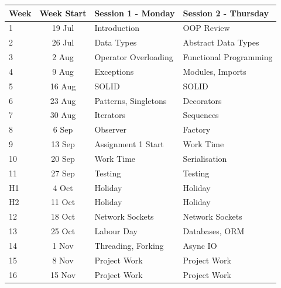 \documentclass{article}
\begin{document}
\renewcommand{\arraystretch}{1.5}
\begin{tabular}{|l|c|l|l|}
\hline
 Week     & Week Start & Session 1 - Monday                 & Session 2 - Thursday    \\ \hline
 1        & 19 Jul     & Introduction                       & OOP Review              \\ \hline
 2        & 26 Jul     & Data Types                         & Abstract Data Types     \\ \hline
 3        &  2 Aug     & Operator Overloading               & Functional Programming  \\ \hline
 4        &  9 Aug     & Exceptions                         & Modules, Imports        \\ \hline
 5        & 16 Aug     & SOLID                              & SOLID                   \\ \hline
 6        & 23 Aug     & Patterns, Singletons               & Decorators              \\ \hline
 7        & 30 Aug     & Iterators                          & Sequences               \\ \hline
 8        &  6 Sep     & Observer                           & Factory                 \\ \hline
 9        & 13 Sep     & Assignment 1 Start                 & Work Time               \\ \hline
 10       & 20 Sep     & Work Time                          & Serialisation           \\ \hline
 11       & 27 Sep     & Testing                            & Testing                 \\ \hline
 H1       &  4 Oct     & Holiday                            & Holiday                 \\ \hline
 H2       & 11 Oct     & Holiday                            & Holiday                 \\ \hline
 12       & 18 Oct     & Network Sockets                    & Network Sockets         \\ \hline
 13       & 25 Oct     & Labour Day                         & Databases, ORM          \\ \hline
 14       &  1 Nov     & Threading, Forking                 & Async IO                \\ \hline
 15       &  8 Nov     & Project Work                       & Project Work            \\ \hline
 16       & 15 Nov     & Project Work                       & Project Work            \\ \hline
\end{tabular}
\end{document}
